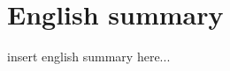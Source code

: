 \graphicspath{{chapt_dutch/}{chapt2/}{chapt3/}{chapt4/}}
\renewcommand{\thesection}{\arabic{section}}    %

\renewcommand{\bibname}{References}
\renewcommand\evenpagerightmark{{\scshape\small English summary}}
\renewcommand\oddpageleftmark{{\scshape\small English summary}}

\chapter[English summary]%
 {English summary}

\hyphenation{}

insert english summary here...

\clearpage




\clearpage{\pagestyle{empty}\cleardoublepage}

\renewcommand*{\thesection}{\thechapter.\arabic{section}}       %


